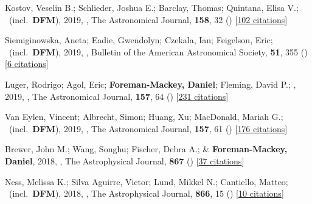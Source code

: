 \item[{\color{numcolor}\scriptsize44}] Kostov, Veselin B.; Schlieder, Joshua E.; Barclay, Thomas; Quintana, Elisa V.; \etal\ (incl.\ \textbf{DFM}), 2019, , The Astronomical Journal, \textbf{158}, 32 () [\href{https://ui.adsabs.harvard.edu/abs/2019AJ....158...32K}{102 citations}]

\item[{\color{numcolor}\scriptsize43}] Siemiginowska, Aneta; Eadie, Gwendolyn; Czekala, Ian; Feigelson, Eric; \etal\ (incl.\ \textbf{DFM}), 2019, , Bulletin of the American Astronomical Society, \textbf{51}, 355 () [\href{https://ui.adsabs.harvard.edu/abs/2019BAAS...51c.355S}{6 citations}]

\item[{\color{numcolor}\scriptsize42}] Luger, Rodrigo; Agol, Eric; \textbf{Foreman-Mackey, Daniel}; Fleming, David P.; \etal, 2019, , The Astronomical Journal, \textbf{157}, 64 () [\href{https://ui.adsabs.harvard.edu/abs/2019AJ....157...64L}{231 citations}]

\item[{\color{numcolor}\scriptsize41}] Van Eylen, Vincent; Albrecht, Simon; Huang, Xu; MacDonald, Mariah G.; \etal\ (incl.\ \textbf{DFM}), 2019, , The Astronomical Journal, \textbf{157}, 61 () [\href{https://ui.adsabs.harvard.edu/abs/2019AJ....157...61V}{176 citations}]

\item[{\color{numcolor}\scriptsize40}] Brewer, John M.; Wang, Songhu; Fischer, Debra A.; \& \textbf{Foreman-Mackey, Daniel}, 2018, , The Astrophysical Journal, \textbf{867} () [\href{https://ui.adsabs.harvard.edu/abs/2018ApJ...867L...3B}{37 citations}]

\item[{\color{numcolor}\scriptsize39}] Ness, Melissa K.; Silva Aguirre, Victor; Lund, Mikkel N.; Cantiello, Matteo; \etal\ (incl.\ \textbf{DFM}), 2018, , The Astrophysical Journal, \textbf{866}, 15 () [\href{https://ui.adsabs.harvard.edu/abs/2018ApJ...866...15N}{10 citations}]

